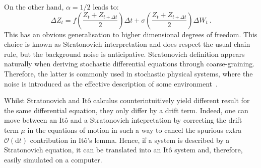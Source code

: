 \documentclass[amsmath,amssymb,11pt]{article}
\begin{document}
On the other hand, $\alpha=1/2$ leads to:
\begin{equation}
    \Delta Z_t = f\left(\frac{Z_t+Z_{t+\Delta t}}{2}\right) \Delta t +\sigma\left(\frac{Z_t+Z_{t+\Delta t}}{2}\right) \Delta W_t \ .
\end{equation}
This has an obvious generalisation to higher dimensional degrees of freedom. This choice is known as Stratonovich interpretation and does respect the usual chain rule, but the background noise is anticipative. Stratonovich definition appears naturally when deriving stochastic differential equations through coarse-graining. Therefore, the latter is commonly used in stochastic physical systems, where the noise is introduced as the effective description of some environment~\cite{kampen1981ito}. 

Whilst Stratonovich and It\^{o} calculus counterintuitively yield different result for the same differential equation, they only differ by a drift term. Indeed, one can move between an It\^o and a Stratonovich intepretation by correcting the drift term $\mu$ in the equations of motion in such a way to cancel the spurious extra $\mathcal{O}(\text{d}t)$ contribution in It\^{o}'s lemma. Hence, if a system is described by a Stratonovich equation, it can be translated into an It\^o system and, therefore, easily simulated on a computer.
\end{document}
